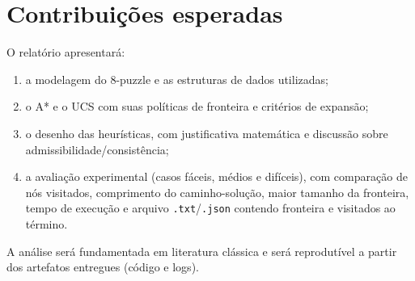 \section{Contribuições esperadas}
O relatório apresentará:
\begin{enumerate}[label=(\roman*),leftmargin=*,itemsep=0pt,topsep=2pt]
  \item a modelagem do 8-puzzle e as estruturas de dados utilizadas;
  \item o A* e o UCS com suas políticas de fronteira e critérios de expansão;
  \item o desenho das heurísticas, com justificativa matemática e discussão sobre admissibilidade/consistência;
  \item a avaliação experimental (casos fáceis, médios e difíceis), com comparação de nós visitados, comprimento do caminho-solução, maior tamanho da fronteira, tempo de execução e arquivo \texttt{.txt}/\texttt{.json} contendo fronteira e visitados ao término.
\end{enumerate}
A análise será fundamentada em literatura clássica \cite{russell2010artificial,luger2009artificial,nilsson1998,ertel2017} e será reprodutível a partir dos artefatos entregues (código e logs).

